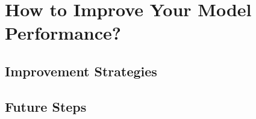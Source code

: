 \chapter{How to Improve Your Model Performance?}

\section{Improvement Strategies}
\label{sec:chap4 section 1}

\section{Future Steps}
\label{sec:chap4 section 2}

